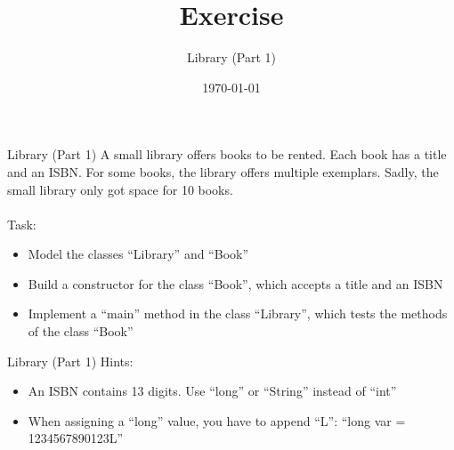 


\title{Exercise}
\subtitle{Library (Part 1)}
\date{\today}




\begin{frame}
    \titlepage
\end{frame}

\begin{frame}{Library (Part 1)}
    A small library offers books to be rented. Each book has a title and an ISBN. For some books, the library offers multiple exemplars. Sadly, the small library only got space for 10 books.\\
    \\
    Task:
    \begin{itemize}
        \item Model the classes ``Library'' and ``Book''
        \item Build a constructor for the class ``Book'', which accepts a title and an ISBN
        \item Implement a ``main'' method in the class ``Library'', which tests the methods of the class ``Book''
    \end{itemize}
\end{frame}

\begin{frame}{Library (Part 1)}
    Hints:
    \begin{itemize}
        \item An ISBN contains 13 digits. Use ``long'' or ``String'' instead of ``int''
        \item When assigning a ``long'' value, you have to append ``L'': ``long var = 1234567890123L''
    \end{itemize}
\end{frame}



